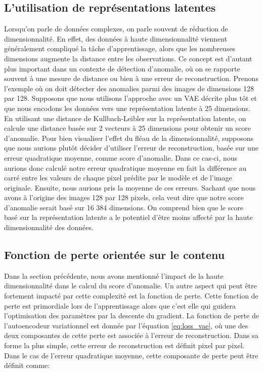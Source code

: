 \subsection{L'utilisation de représentations latentes}

Lorsqu'on parle de données complexes, on parle souvent de réduction de dimensionnalité. En effet, des données à haute dimensionnalité viennent généralement compliqué la tâche d'apprentissage, alors que les nombreuses dimensions augmente la distance entre les observations. Ce concept est d'autant plus important dans un contexte de détection d'anomalie, où on se rapporte souvent à une mesure de distance ou bien à une erreur de reconstruction. Prenons l'exemple où on doit détecter des anomalies parmi des images de dimensions 128 par 128. Supposons que nous utilisons l'approche avec un VAE décrite plus tôt et que nous encodons les données vers une représentation latente à 25 dimensions. En utilisant une distance de Kullbach-Leibler sur la représentation latente, on calcule une distance basée sur 2 vecteurs à 25 dimensions pour obtenir un score d'anomalie. Pour bien visualiser l'effet du fléau de la dimensionnalité, supposons que nous aurions plutôt décider d'utiliser l'erreur de reconstruction, basée sur une erreur quadratique moyenne, comme score d'anomalie. Dans ce cas-ci, nous aurions donc calculé notre erreur quadratique moyenne en fait la différence au carré entre les valeurs de chaque pixel prédite par le modèle et de l'image originale. Ensuite, nous aurions pris la moyenne de ces erreurs. Sachant que nous avons à l'origine des images 128 par 128 pixels, cela veut dire que notre score d'anomalie serait basé sur 16 384 dimensions. On comprend bien que le score basé sur la représentation latente a le potentiel d'être moins affecté par la haute dimensionnalité des données.

\subsection{Fonction de perte orientée sur le contenu}

Dans la section précédente, nous avons mentionné l'impact de la haute dimensionnalité dans le calcul du score d'anomalie. Un autre aspect qui peut être fortement impacté par cette complexité est la fonction de perte. Cette fonction de perte est primordiale lors de l'apprentissage alors que c'est elle qui guidera l'optimisation des paramètres par la descente du gradient. La fonction de perte de l'autoencodeur variationnel est donnée par l'équation  \ref{eq:loss_vae}, où une des deux composantes de cette perte est associée à l'erreur de reconstruction. Dans sa forme la plus simple, cette erreur de reconstruction est définit pixel par pixel. Dans le cas de l'erreur quadratique moyenne, cette composante de perte peut être définit comme:


